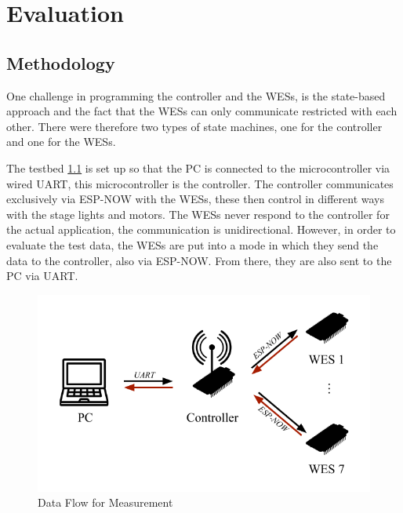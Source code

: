 
\chapter{Evaluation}
\label{sec:evaluation}

\section{Methodology}
One challenge in programming the controller and the WESs,
is the state-based approach and the fact that the WESs can only communicate restricted with each other.
There were therefore two types of state machines, one for the controller and one for the WESs.

The testbed \cref{fig:testbed} is set up so that the PC is connected to the microcontroller 
via wired \ac{UART}, this microcontroller is the controller.
The controller communicates exclusively via ESP-NOW with the WESs,
these then control in different ways with the stage lights and motors.
The WESs never respond to the controller for the actual application, the communication is unidirectional.
However, in order to evaluate the test data, 
the WESs are put into a mode in which they send the data to the controller, 
also via ESP-NOW.
From there, they are also sent to the PC via UART.

\begin{figure}[h]
	\centering
	\includegraphics[scale=0.75]{figures/TestFlow.pdf}
	\caption{Data Flow for Measurement}
	\label{fig:testbed}
\end{figure}

